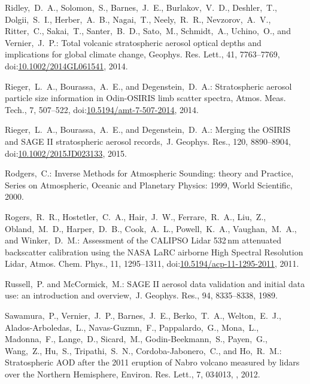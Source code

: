 \documentclass[amtd, online, hvmath]{copernicus}
\begin{document}
\begin{thebibliography}{99}
Ridley,~D.~A., Solomon,~S., Barnes,~J.~E., Burlakov,~V.~D., Deshler,~T.,
Dolgii,~S.~I., Herber,~A.~B., Nagai,~T., Neely,~R.~R., Nevzorov,~A.~V.,
Ritter,~C., Sakai,~T., Santer,~B.~D., Sato,~M., Schmidt,~A., Uchino,~O., and
Vernier,~J.~P.: Total volcanic stratospheric aerosol optical depths and
implications for global climate change, Geophys. Res. Lett., 41, 7763--7769,
doi:\href{http://dx.doi.org/10.1002/2014GL061541}{10.1002/2014GL061541},
2014.


Rieger,~L.~A., Bourassa,~A.~E., and Degenstein,~D.~A.: Stratospheric aerosol
particle size information in Odin-OSIRIS limb scatter spectra, Atmos. Meas.
Tech., 7, 507--522,
doi:\href{http://dx.doi.org/10.5194/amt-7-507-2014}{10.5194/amt-7-507-2014},
2014.



Rieger,~L.~A., Bourassa,~A.~E., and Degenstein,~D.~A.: Merging the OSIRIS and
SAGE II stratospheric aerosol records,~J. Geophys. Res., 120, 8890--8904,
doi:\href{http://dx.doi.org/10.1002/2015JD023133}{10.1002/2015JD023133},
2015.


Rodgers,~C.: Inverse Methods for Atmospheric Sounding: theory and Practice,
Series on Atmospheric, Oceanic and Planetary Physics: 1999, World Scientific,
2000.


Rogers,~R.~R., Hostetler,~C.~A., Hair,~J.~W., Ferrare,~R.~A., Liu,~Z.,
Obland,~M.~D., Harper,~D.~B., Cook,~A.~L., Powell,~K.~A., Vaughan,~M.~A., and
Winker,~D.~M.: Assessment of the CALIPSO Lidar 532\,nm attenuated backscatter
calibration using the NASA LaRC airborne High Spectral Resolution Lidar,
Atmos. Chem. Phys., 11, 1295--1311,
doi:\href{http://dx.doi.org/10.5194/acp-11-1295-2011}{10.5194/acp-11-1295-2011},
2011.



Russell,~P. and McCormick,~M.: SAGE II aerosol data validation and initial
data use: an introduction and overview,~J. Geophys. Res., 94, 8335--8338,
1989.


Sawamura,~P., Vernier,~J.~P., Barnes,~J.~E., Berko,~T.~A., Welton,~E.~J.,
Alados-Arboledas,~L., Navas-Guzmn,~F., Pappalardo,~G., Mona,~L., Madonna,~F.,
Lange,~D., Sicard,~M., Godin-Beekmann,~S., Payen,~G., Wang,~Z., Hu,~S.,
Tripathi,~S.~N., Cordoba-Jabonero,~C., and Ho,~R.~M.: Stratospheric AOD after
the 2011 eruption of Nabro volcano measured by lidars over the Northern
Hemisphere, Environ. Res. Lett., 7, 034013,
, 2012.



\end{thebibliography}
\end{document}
